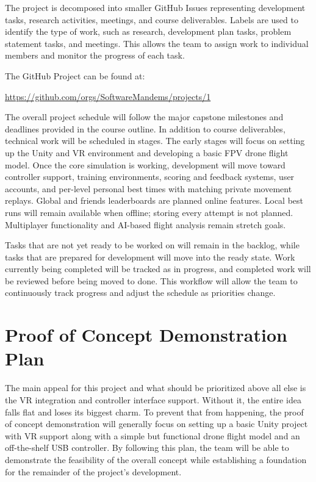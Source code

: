 \documentclass{article}
\begin{document}
\vspace{0.75em}

The project is decomposed into smaller GitHub Issues representing development
tasks, research activities, meetings, and course deliverables. Labels are used
to identify the type of work, such as research, development plan tasks, problem
statement tasks, and meetings. This allows the team to assign work to individual
members and monitor the progress of each task.

The GitHub Project can be found at:

\begin{center}
\url{https://github.com/orgs/SoftwareMandems/projects/1}
\end{center}

The overall project schedule will follow the major capstone milestones and
deadlines provided in the course outline. In addition to course deliverables,
technical work will be scheduled in stages. The early stages will focus on setting up the Unity and VR environment and developing a basic FPV drone flight model.
Once the core simulation is working, development will move toward controller
support, training environments, scoring and feedback systems, user accounts,
and per-level personal best times with matching private movement replays.
Global and friends leaderboards are planned online features. Local best runs
will remain available when offline; storing every attempt is not planned.
Multiplayer functionality and AI-based flight analysis remain stretch goals.

Tasks that are not yet ready to be worked on will remain in the backlog, while
tasks that are prepared for development will move into the ready state. Work
currently being completed will be tracked as in progress, and completed work
will be reviewed before being moved to done. This workflow will allow the team
to continuously track progress and adjust the schedule as priorities change.


\section{Proof of Concept Demonstration Plan}

The main appeal for this project and what should be prioritized above all else
is the VR integration and controller interface support. Without it, the entire
idea falls flat and loses its biggest charm. To prevent that from happening, the proof of concept
demonstration will generally focus on setting up a basic Unity project with VR support along
with a simple but functional drone flight model and an off-the-shelf USB controller.
By following this plan, the team will be able to demonstrate the feasibility of the 
overall concept while establishing a foundation for the remainder of the project's
development.
\end{document}
